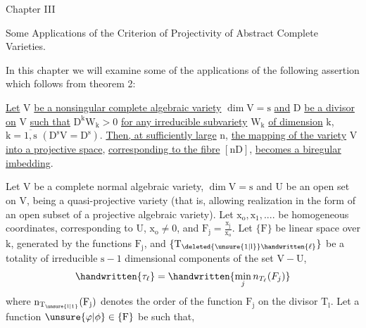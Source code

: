 \begin{center}
Chapter III

Some Applications of the Criterion of Projectivity
of Abstract Complete Varieties.
\end{center}

In this chapter we will examine some of the applications
of the following assertion which follows from theorem 2:

\uline{Let} $\mathrm{V}$ \uline{be a nonsingular complete algebraic variety}
$\mathrm{\dim V=s}$ \uline{and} $\mathrm{D}$ \uline{be a divisor on} $\mathrm{V}$ \uline{such that} $\mathrm{D^k W_k>0}$
\uline{for any irreducible subvariety} $\mathrm{W_k}$ \uline{of dimension}
$\mathrm{k}$, $\mathrm{k=\overline{1,s}}$ $\mathrm{(D^sV=D^s)}$. \uline{Then, at sufficiently large} $\mathrm{n}$,
\uline{the mapping of the variety} $\mathrm{V}$ \uline{into a projective space},
\uline{corresponding to the fibre} $\mathrm{[nD]}$, \uline{becomes a biregular
imbedding}.

Let $\mathrm{V}$ be a complete normal algebraic variety,
$\mathrm{\dim V=s}$ and $\mathrm{U}$ be an open set on $\mathrm{V}$, being a quasi-projective
variety (that is, allowing realization in the
form of an open subset of a projective algebraic variety).
Let $\mathrm{x_o,x_1,....}$ be homogeneous coordinates, corresponding
to $\mathrm{U}$, $\mathrm{x_o\ne 0}$, and $\mathrm{F_j=\frac{x_j}{x_o}}$. Let $\mathrm{\{F\}}$ be  linear space
over $\mathrm{k}$, generated by the functions $\mathrm{F_j}$, and $\mathrm{\{T_{\deleted{\unsure{1|l}}\handwritten{\ell}}\}}$ be a
\margin{\handwritten{$\mathrm{\ell}$}}
totality of irreducible $\mathrm{s-1}$ dimensional components of
the set $\mathrm{V-U}$,
\[
\handwritten{\tau_\ell} = \handwritten{\min_j n_{T_\ell}(F_j)}
\]
where $\mathrm{n_{T_{\unsure{l|1}}}(F_j)}$ denotes the order of the function $\mathrm{F_j}$ on
the divisor $\mathrm{T_l}$. Let a function $\mathrm{\unsure{\varphi|\phi}\in\{F\}}$ be such that,

